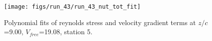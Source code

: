 \begin{figure}[H]
\centering
\texttt{[image: figs/run\_43/run\_43\_nut\_tot\_fit]}
\caption{Polynomial fits of reynolds stress and velocity gradient terms at $z/c$=9.00, $V_{free}$=19.08, station 5.}
\label{fig:run_43_nut_tot_fit}
\end{figure}


